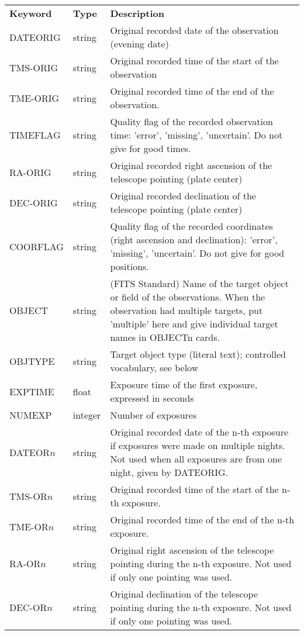 \documentclass[11pt]{ivoa}
\begin{document}
\begingroup
\footnotesize
\begin{longtable}{llp{}}
\sptablerule
\textbf{Keyword}&
\textbf{Type}&\textbf{Description}\\
\sptablerule
\endhead
DATEORIG  &string  &
  Original recorded date of the observation (evening date)\\
TMS-ORIG  &string  &
  Original recorded time of the start of the observation\\
TME-ORIG  &string  &
  Original recorded time of the end of the observation.\\
TIMEFLAG  &string  &
  Quality flag of the recorded observation time: 'error', 'missing',
  'uncertain'.  Do not give for good times.\\
RA-ORIG   &string  &
  Original recorded right ascension of the telescope pointing (plate center)\\
DEC-ORIG  &string  &
  Original recorded declination of the telescope pointing (plate center)\\
COORFLAG  &string  &
  Quality flag of the recorded coordinates (right ascension and
  declination): 'error', 'missing', 'uncertain'.  Do not give for good
  positions.\\
OBJECT    &string &
  (FITS Standard) Name of the target object or field of the
  observations.  When the observation had multiple targets, put
  'multiple' here and give
  individual target names in OBJECTn cards.\\
OBJTYPE   &string  &
  Target object type (literal text); controlled vocabulary, see below\\
EXPTIME   &float   &
  Exposure time of the first exposure, expressed in seconds\\
NUMEXP    &integer &Number of exposures\\
DATEOR$n$ &string  &
  Original recorded date of the n-th exposure if exposures
  were made on multiple nights. Not used when all exposures are from
  one night, given by DATEORIG.\\
TMS-OR$n$ &string  &
  Original recorded time of the start of the n-th exposure.\\
TME-OR$n$ &string  &
  Original recorded time of the end of the n-th exposure.\\
RA-OR$n$  &string  &
  Original right ascension of the telescope pointing during the n-th
  exposure. Not used if only one pointing was used.\\
DEC-OR$n$ &string   &
  Original declination of the telescope pointing during the n-th
  exposure. Not used if only one pointing was used.\\

\end{longtable}
\end{document}
